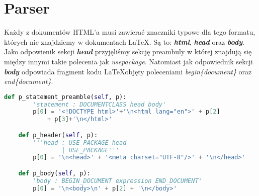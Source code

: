 \section{Parser}

Każdy z dokumentów HTML'a musi zawierać znaczniki typowe dla tego formatu, których nie znajdziemy w dokumentach \LaTeX. Są to: \textbf{\textit{html}},
\textbf{\textit{head}} oraz \textbf{\textit{body}}. Jako odpowienik sekcji \textbf{\textit{head}} przyjęliśmy sekcję preambuly w której 
znajdują się między innymi takie polecenia jak \textit{usepackage}. Natomiast jak odpowiednik sekcji \textbf{\textit{body}} odpowiada fragment kodu 
\LaTeX \space objęty poleceniami \textit{begin\{document\}} oraz \textit{end\{document\}}.

\begin{lstlisting}[language={Python}, caption={Preambuła}, label={gramatyka-preamble}]
    def p_statement_preamble(self, p):
        'statement : DOCUMENTCLASS head body'
        p[0] = '<!DOCTYPE html>'+'\n<html lang="en">' + p[2] 
            + p[3]+'\n</html>'

    def p_header(self, p):
        '''head : USE_PACKAGE head
                | USE_PACKAGE'''
        p[0] = '\n<head>' + '<meta charset="UTF-8"/>' + '\n</head>'

    def p_body(self, p):
        'body : BEGIN_DOCUMENT expression END_DOCUMENT'
        p[0] = '\n<body>\n' + p[2] + '\n</body>'
\end{lstlisting}











